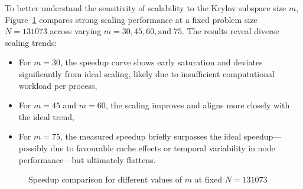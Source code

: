 \documentclass[12pt,a4paper]{report}
\begin{document}
To better understand the sensitivity of scalability to the Krylov subspace size $m$, Figure~\ref{fig:stromboli_common_n_diff_m} compares strong scaling performance at a fixed problem size $N = 131073$ across varying $m = 30, 45, 60, \text{and} \; 75$. The results reveal diverse scaling trends:  
\begin{itemize}
    \item For $m=30$, the speedup curve shows early saturation and deviates significantly from ideal scaling, likely due to insufficient computational workload per process,
    \item For $m=45$ and $m=60$, the scaling improves and aligns more closely with the ideal trend,
    \item For $m=75$, the measured speedup briefly surpasses the ideal speedup—possibly due to favourable cache effects or temporal variability in node performance—but ultimately flattens.
\end{itemize}

\begin{figure}[htbp]
\centering
{}
\caption{Speedup comparison for different values of $m$ at fixed $N=131073$}
\label{fig:stromboli_common_n_diff_m}
\end{figure}
\end{document}
